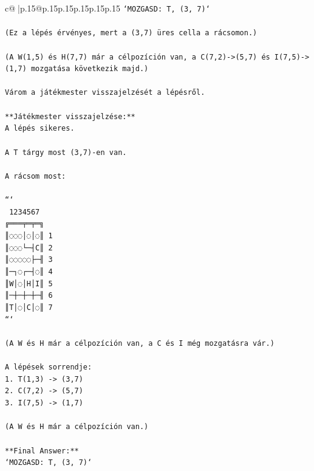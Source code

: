 \documentclass{article}
\begin{document}
{\begin{supertabular}{c@{$\;$}|p{.15\linewidth}@{}p{.15\linewidth}p{.15\linewidth}p{.15\linewidth}p{.15\linewidth}p{.15\linewidth}}
{{{\texttt{`MOZGASD: T, (3, 7)`  } \\
\\ 
\texttt{(Ez a lépés érvényes, mert a (3,7) üres cella a rácsomon.)  } \\
\\ 
\texttt{(A W(1,5) és H(7,7) már a célpozíción van, a C(7,2){-}>(5,7) és I(7,5){-}>(1,7) mozgatása következik majd.)  } \\
\\ 
\texttt{Várom a játékmester visszajelzését a lépésről.  } \\
\\ 
\texttt{**Játékmester visszajelzése:**  } \\
\texttt{A lépés sikeres.  } \\
\\ 
\texttt{A T tárgy most (3,7){-}en van.  } \\
\\ 
\texttt{A rácsom most:  } \\
\\ 
\texttt{```} \\
\texttt{ 1234567} \\
\texttt{╔═══╤═╤═╗} \\
\texttt{║◌◌◌│◌│◌║ 1} \\
\texttt{║◌◌◌└─┤C║ 2} \\
\texttt{║◌◌◌◌◌├─╢ 3} \\
\texttt{║─┐◌┌─┤◌║ 4} \\
\texttt{║W│◌│H│I║ 5} \\
\texttt{║─┼─┼─┼─╢ 6} \\
\texttt{║T│◌│C│◌║ 7} \\
\texttt{```  } \\
\\ 
\texttt{(A W és H már a célpozíción van, a C és I még mozgatásra vár.)  } \\
\\ 
\texttt{A lépések sorrendje:  } \\
\texttt{1. T(1,3) {-}> (3,7)  } \\
\texttt{2. C(7,2) {-}> (5,7)  } \\
\texttt{3. I(7,5) {-}> (1,7)  } \\
\\ 
\texttt{(A W és H már a célpozíción van.)  } \\
\\ 
\texttt{**Final Answer:**  } \\
\texttt{`MOZGASD: T, (3, 7)`  } \\
\\ 
}}}
\end{supertabular}}
\end{document}
